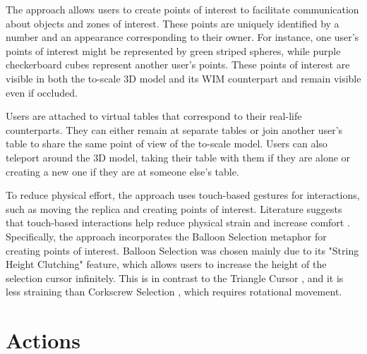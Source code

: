     The approach allows users to create points of interest to facilitate communication about objects and zones of interest. These points are uniquely identified by a number and an appearance corresponding to their owner. For instance, one user's points of interest might be represented by green striped spheres, while purple checkerboard cubes represent another user's points. These points of interest are visible in both the to-scale 3D model and its WIM counterpart and remain visible even if occluded.

    Users are attached to virtual tables that correspond to their real-life counterparts. They can either remain at separate tables or join another user's table to share the same point of view of the to-scale model. Users can also teleport around the 3D model, taking their table with them if they are alone or creating a new one if they are at someone else's table.

    To reduce physical effort, the approach uses touch-based gestures for interactions, such as moving the replica and creating points of interest. Literature suggests that touch-based interactions help reduce physical strain and increase comfort \cite{benkoBalloonSelectionMultiFinger2007, almeidaSIT6IndirectTouchbased2023}. Specifically, the approach incorporates the Balloon Selection metaphor \cite{benkoBalloonSelectionMultiFinger2007} for creating points of interest. Balloon Selection was chosen mainly due to its "String Height Clutching" feature, which allows users to increase the height of the selection cursor infinitely. This is in contrast to the Triangle Cursor \cite{strothoffTriangleCursorInteractions2011}, and it is less straining than Corkscrew Selection \cite{daiberBalloonSelectionRevisited2012}, which requires rotational movement.

    
\section{Actions} \label{sec:actions}

